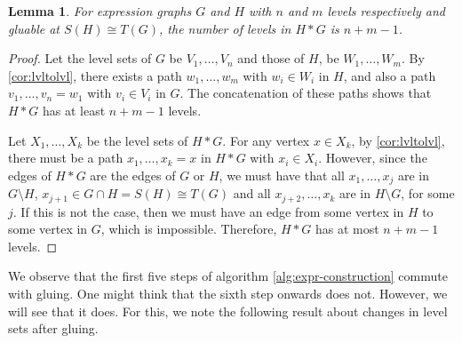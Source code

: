 \documentclass{amsart}
\numberwithin{thm}{section}
\newtheorem{lem}[thm]{Lemma}
\theoremstyle{definition}
\begin{document}
\begin{lem}
For expression graphs $G$ and $H$ with $n$ and $m$ levels respectively and
gluable at $S(H) \cong T(G)$, the number of levels in $H * G$ is $n + m - 1$.
\end{lem}
\begin{proof}
Let the level sets of $G$ be $V_1, \dots, V_n$ and
those of $H$, be $W_1, \dots, W_m$. By \ref{cor:lvltolvl}, there exists a path
$w_1, \dots, w_m$ with $w_i \in W_i$ in $H$, and also a path
$v_1, \dots, v_n = w_1$ with $v_i \in V_i$ in $G$. The concatenation of these
paths shows that $H * G$ has at least $n + m - 1$ levels.

Let $X_1, \dots, X_k$ be the level sets of $H * G$. For any vertex
$x \in X_k$, by \ref{cor:lvltolvl}, there must be a path $x_1, \dots, x_k = x$
in $H * G$ with $x_i \in X_i$. However, since the edges of $H * G$ are the edges
of $G$ or $H$, we must have that all $x_1, \dots, x_{j}$ are in
$G \setminus H$, $x_{j + 1} \in G \cap H = S(H) \cong T(G)$ and all
$x_{j + 2}, \dots, x_k$ are in $H \setminus G$, for some $j$. If this is
not the case, then we must have an edge from some vertex in $H$ to some vertex
in $G$, which is impossible. Therefore, $H * G$ has at most $n + m - 1$ levels.
\end{proof}

We observe that the first five steps of algorithm \ref{alg:expr-construction}
commute with gluing. One might think that the sixth
step onwards does not. However, we will see that it does. For this, we note the
following result about changes in level sets after gluing.
\end{document}
